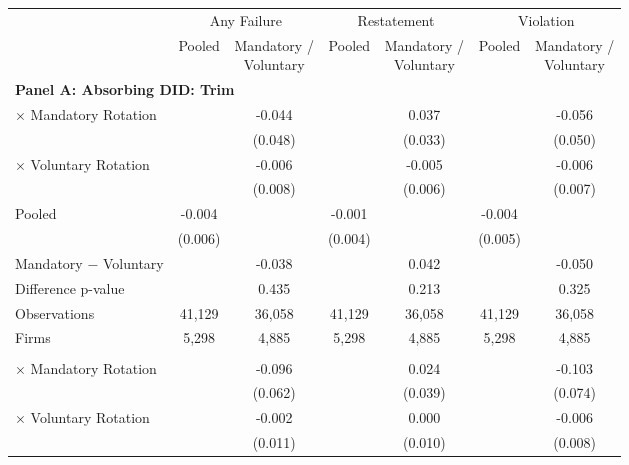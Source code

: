 \documentclass[10pt]{article}
\newcommand{\sym}[1]{\textsuperscript{#1}}
\begin{document}
\begin{minipage}{19cm}\fontsize{10}{12}\selectfont\setlength{\tabcolsep}{4pt}\renewcommand{\arraystretch}{1.12}


\def\sym#1{\ifmmode^{#1}\else\(^{#1}\)\fi}
\centering
{}
\label{tab:absorbing-transition-bachelor-plus-upgrade-no-auditfirm-fe}
\begin{threeparttable}

\begin{tabular}{l cc cc cc}
\toprule
 & \multicolumn{2}{c}{Any Failure} & \multicolumn{2}{c}{Restatement} & \multicolumn{2}{c}{Violation} \\
\cmidrule(lr){2-3}\cmidrule(lr){4-5}\cmidrule(lr){6-7}
 & Pooled & \shortstack{Mandatory /\\Voluntary} & Pooled & \shortstack{Mandatory /\\Voluntary} & Pooled & \shortstack{Mandatory /\\Voluntary} \\
\midrule
\multicolumn{7}{l}{\textbf{Panel A: Absorbing DID: Trim}} \\
$\times$ Mandatory Rotation &  & -0.044 &  & 0.037 &  & -0.056 \\
 &  & (0.048) &  & (0.033) &  & (0.050) \\
$\times$ Voluntary Rotation &  & -0.006 &  & -0.005 &  & -0.006 \\
 &  & (0.008) &  & (0.006) &  & (0.007) \\
Pooled & -0.004 &  & -0.001 &  & -0.004 &  \\
 & (0.006) &  & (0.004) &  & (0.005) &  \\
Mandatory $-$ Voluntary &  & -0.038 &  & 0.042 &  & -0.050 \\
Difference p-value &  & 0.435 &  & 0.213 &  & 0.325 \\
Observations & 41,129 & 36,058 & 41,129 & 36,058 & 41,129 & 36,058 \\
Firms & 5,298 & 4,885 & 5,298 & 4,885 & 5,298 & 4,885 \\
\addlinespace
\multicolumn{7}{l}{\textbf{Panel B: Absorbing DID: Strict}} \\
$\times$ Mandatory Rotation &  & -0.096 &  & 0.024 &  & -0.103 \\
 &  & (0.062) &  & (0.039) &  & (0.074) \\
$\times$ Voluntary Rotation &  & -0.002 &  & 0.000 &  & -0.006 \\
 &  & (0.011) &  & (0.010) &  & (0.008) \\

\end{tabular}
\end{threeparttable}
\end{minipage}
\end{document}
